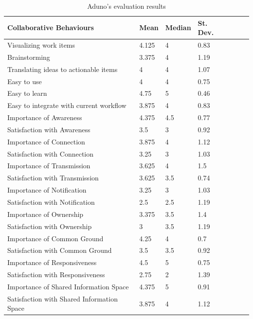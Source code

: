 \documentclass[conference]{IEEEtran}
\begin{document}
\begin{table}[t]
\begin{center}
\begin{tabular}{@{\hspace{.2cm}}llll@{\hspace{.2cm}}c@{\hspace{.2cm}}c@{\hspace{.2cm}}c@{\hspace{.2cm}}}
\hline
Collaborative Behaviours&  Mean&   Median&  St. Dev.&\\
\hline
Visualizing work items& 4.125& 4& 0.83\\
Brainstorming& 3.375& 4& 1.19\\
Translating ideas to actionable items& 4& 4& 1.07\\
Easy to use& 4& 4& 0.75\\
Easy to learn& 4.75& 5& 0.46\\
Easy to integrate with current workflow& 3.875& 4& 0.83\\
\hline
Importance of Awareness& 4.375& 4.5& 0.77\\
Satisfaction with Awareness& 3.5& 3& 0.92\\
\hline
Importance of Connection& 3.875& 4& 1.12\\
Satisfaction with Connection& 3.25& 3& 1.03\\
\hline
Importance of Transmission& 3.625& 4& 1.5\\
Satisfaction with Transmission& 3.625& 3.5& 0.74\\
\hline
Importance of Notification& 3.25& 3& 1.03\\
Satisfaction with Notification& 2.5& 2.5& 1.19\\
\hline
Importance of Ownership& 3.375& 3.5& 1.4\\
Satisfaction with Ownership& 3& 3.5& 1.19\\
\hline
Importance of Common Ground& 4.25& 4& 0.7\\
Satisfaction with Common Ground& 3.5& 3.5& 0.92\\
\hline
Importance of Responsiveness& 4.5& 5& 0.75\\
Satisfaction with Responsiveness& 2.75& 2& 1.39\\
\hline
Importance of Shared Information Space& 4.375& 5& 0.91\\
Satisfaction with Shared Information Space& 3.875& 4& 1.12\\
\hline
\end{tabular}
\end{center}
\caption{Aduno's evaluation results}
\label{tab:surveyresults}
\end{table}
\end{document}
